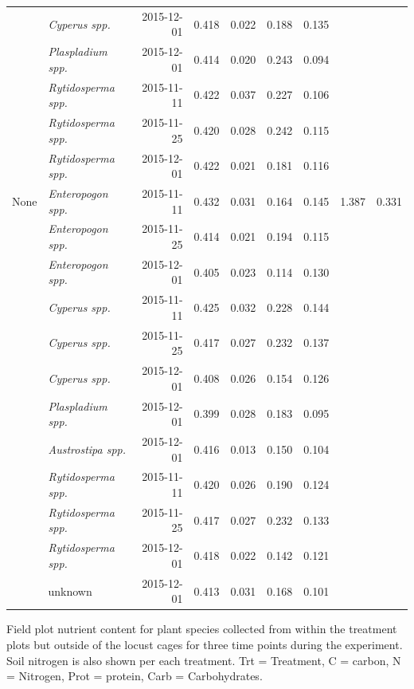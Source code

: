 \documentclass[
]{article}
\begin{document}
\begin{tbl}
\begin{minipage}{\linewidth}
\begin{longtable*}{@{\extracolsep{\fill}}llrrrrrrr}
 & {\itshape Cyperus spp.} & 2015-12-01 & 0.418 & 0.022 & 0.188 & 0.135 &  &  \\ 
 & {\itshape Plaspladium spp.} & 2015-12-01 & 0.414 & 0.020 & 0.243 & 0.094 &  &  \\ 
 & {\itshape Rytidosperma spp.} & 2015-11-11 & 0.422 & 0.037 & 0.227 & 0.106 &  &  \\ 
 & {\itshape Rytidosperma spp.} & 2015-11-25 & 0.420 & 0.028 & 0.242 & 0.115 &  &  \\ 
 & {\itshape Rytidosperma spp.} & 2015-12-01 & 0.422 & 0.021 & 0.181 & 0.116 &  &  \\ 
None & {\itshape Enteropogon spp.} & 2015-11-11 & 0.432 & 0.031 & 0.164 & 0.145 & 1.387 & 0.331 \\ 
 & {\itshape Enteropogon spp.} & 2015-11-25 & 0.414 & 0.021 & 0.194 & 0.115 &  &  \\ 
 & {\itshape Enteropogon spp.} & 2015-12-01 & 0.405 & 0.023 & 0.114 & 0.130 &  &  \\ 
 & {\itshape Cyperus spp.} & 2015-11-11 & 0.425 & 0.032 & 0.228 & 0.144 &  &  \\ 
 & {\itshape Cyperus spp.} & 2015-11-25 & 0.417 & 0.027 & 0.232 & 0.137 &  &  \\ 
 & {\itshape Cyperus spp.} & 2015-12-01 & 0.408 & 0.026 & 0.154 & 0.126 &  &  \\ 
 & {\itshape Plaspladium spp.} & 2015-12-01 & 0.399 & 0.028 & 0.183 & 0.095 &  &  \\ 
 & {\itshape Austrostipa spp.} & 2015-12-01 & 0.416 & 0.013 & 0.150 & 0.104 &  &  \\ 
 & {\itshape Rytidosperma spp.} & 2015-11-11 & 0.420 & 0.026 & 0.190 & 0.124 &  &  \\ 
 & {\itshape Rytidosperma spp.} & 2015-11-25 & 0.417 & 0.027 & 0.232 & 0.133 &  &  \\ 
 & {\itshape Rytidosperma spp.} & 2015-12-01 & 0.418 & 0.022 & 0.142 & 0.121 &  &  \\ 
 & unknown & 2015-12-01 & 0.413 & 0.031 & 0.168 & 0.101 &  &  \\ 
\bottomrule
\end{longtable*}
\endgroup

\end{minipage}%

\caption{\label{tbl-field-cage-plant-soil-nutrients}Field plot nutrient
content for plant species collected from within the treatment plots but
outside of the locust cages for three time points during the experiment.
Soil nitrogen is also shown per each treatment. Trt = Treatment, C =
carbon, N = Nitrogen, Prot = protein, Carb = Carbohydrates.}

\end{tbl}%
\end{document}
